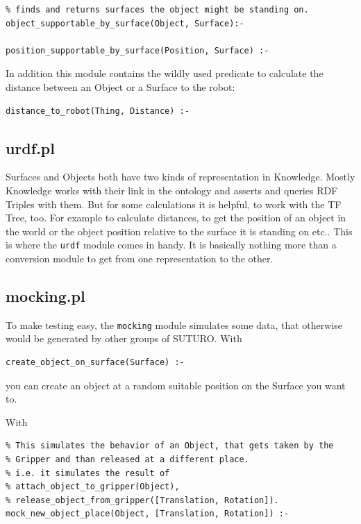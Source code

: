 \documentclass[main.tex]{subfiles}
\begin{document}
\begin{lstlisting}
% finds and returns surfaces the object might be standing on.
object_supportable_by_surface(Object, Surface):-

position_supportable_by_surface(Position, Surface) :-
\end{lstlisting}

In addition this module contains the wildly used predicate to calculate the distance between an Object or a Surface to the robot:

\begin{lstlisting}
distance_to_robot(Thing, Distance) :-
\end{lstlisting}

\subsection{urdf.pl}

Surfaces and Objects both have two kinds of representation in Knowledge. Mostly Knowledge works with their link in the ontology and asserts and queries RDF Triples with them. But for some calculations it is helpful, to work with the TF Tree, too. For example to calculate distances, to get the position of an object in the world or the object position relative to the surface it is standing on etc.. This is where the \texttt{urdf} module comes in handy. It is basically nothing more than a conversion module to get from one representation to the other.

\subsection{mocking.pl}

To make testing easy, the \texttt{mocking} module simulates some data, that otherwise would be generated by other groups of SUTURO. With

\begin{lstlisting}
create_object_on_surface(Surface) :-
\end{lstlisting}

you can create an object at a random suitable position on the Surface you want to. 

With 

\begin{lstlisting}
% This simulates the behavior of an Object, that gets taken by the 
% Gripper and than released at a different place.
% i.e. it simulates the result of
% attach_object_to_gripper(Object),
% release_object_from_gripper([Translation, Rotation]).
mock_new_object_place(Object, [Translation, Rotation]) :-
\end{lstlisting}
\end{document}
